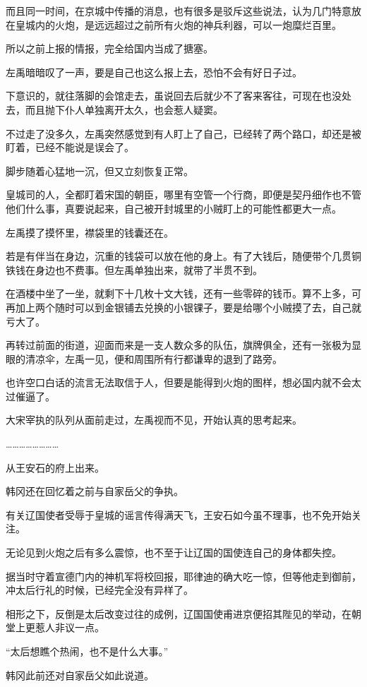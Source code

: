 而且同一时间，在京城中传播的消息，也有很多是驳斥这些说法，认为几门特意放在皇城内的火炮，是远远超过之前所有火炮的神兵利器，可以一炮糜烂百里。

所以之前上报的情报，完全给国内当成了搪塞。

左禹暗暗叹了一声，要是自己也这么报上去，恐怕不会有好日子过。

下意识的，就往落脚的会馆走去，虽说回去后就少不了客来客往，可现在也没处去，而且抛下仆人单独离开太久，也会惹人疑窦。

不过走了没多久，左禹突然感觉到有人盯上了自己，已经转了两个路口，却还是被盯着，已经不能说是误会了。

脚步随着心猛地一沉，但又立刻恢复正常。

皇城司的人，全都盯着宋国的朝臣，哪里有空管一个行商，即便是契丹细作也不管他们什么事，真要说起来，自己被开封城里的小贼盯上的可能性都更大一点。

左禹摸了摸怀里，襟袋里的钱囊还在。

若是有伴当在身边，沉重的钱袋可以放在他的身上。有了大钱后，随便带个几贯铜铁钱在身边也不费事。但左禹单独出来，就带了半贯不到。

在酒楼中坐了一坐，就剩下十几枚十文大钱，还有一些零碎的钱币。算不上多，可再加上两个随时可以到金银铺去兑换的小银锞子，要是给哪个小贼摸了去，自己就亏大了。

再转过前面的街道，迎面而来是一支人数众多的队伍，旗牌俱全，还有一张极为显眼的清凉伞，左禹一见，便和周围所有行都谦卑的退到了路旁。

也许空口白话的流言无法取信于人，但要是能得到火炮的图样，想必国内就不会太过催逼了。

大宋宰执的队列从面前走过，左禹视而不见，开始认真的思考起来。

……………………

从王安石的府上出来。

韩冈还在回忆着之前与自家岳父的争执。

有关辽国使者受辱于皇城的谣言传得满天飞，王安石如今虽不理事，也不免开始关注。

无论见到火炮之后有多么震惊，也不至于让辽国的国使连自己的身体都失控。

据当时守着宣德门内的神机军将校回报，耶律迪的确大吃一惊，但等他走到御前，冲太后行礼的时候，已经完全没有异样了。

相形之下，反倒是太后改变过往的成例，辽国国使甫进京便招其陛见的举动，在朝堂上更惹人非议一点。

“太后想瞧个热闹，也不是什么大事。”

韩冈此前还对自家岳父如此说道。

